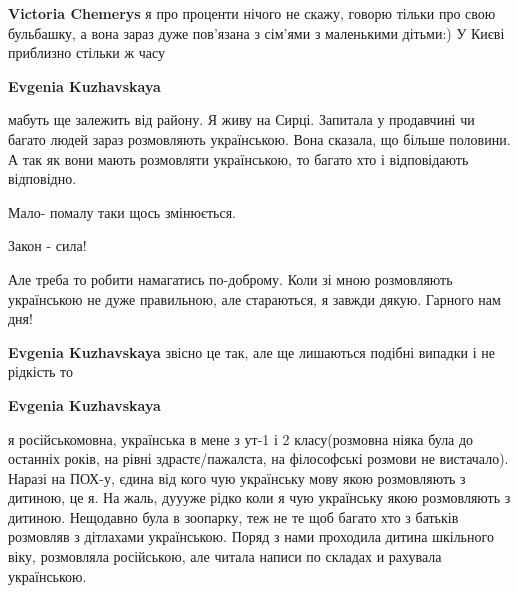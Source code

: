 \begin{itemize}
\begin{itemize}
\textbf{Victoria Chemerys} я про проценти нічого не скажу, говорю тільки про свою бульбашку, а вона зараз дуже пов'язана з сім'ями з маленькими дітьми:) У Києві приблизно стільки ж часу

 
\textbf{Evgenia Kuzhavskaya} 

мабуть ще залежить від району. Я живу на Сирці. Запитала у продавчині чи багато
людей зараз розмовляють українською. Вона сказала, що більше половини. А так як
вони мають розмовляти українською, то багато хто і відповідають відповідно.

Мало- помалу таки щось змінюється.

Закон - сила!

Але треба то робити намагатись по-доброму. Коли зі мною розмовляють українською
не дуже правильною, але стараються, я завжди дякую. Гарного нам дня!



 
\textbf{Evgenia Kuzhavskaya} звісно це так, але ще лишаються подібні випадки і не рідкість то

 
\textbf{Evgenia Kuzhavskaya} 

я російськомовна, українська в мене з ут-1 і 2 класу(розмовна ніяка була до
останніх років, на рівні здрастє/пажалста, на філософські розмови не
вистачало). Наразі на ПОХ-у, єдина від кого чую українську мову якою
розмовляють з дитиною, це я. На жаль, дуууже рідко коли я чую українську якою
розмовляють з дитиною. Нещодавно була в зоопарку, теж не те щоб багато хто з
батьків розмовляв з дітлахами українською. Поряд з нами проходила дитина
шкільного віку, розмовляла російською, але читала написи по складах и рахувала
українською.


\end{itemize}
\end{itemize}

